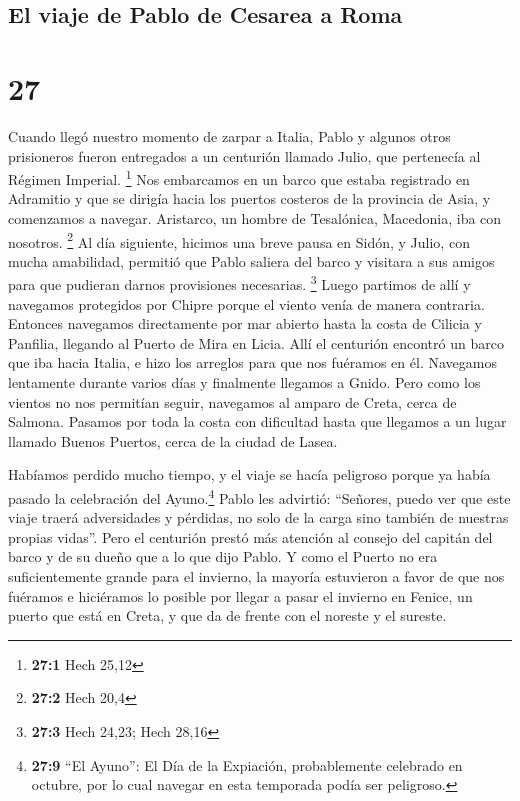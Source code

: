 \hypertarget{el-viaje-de-pablo-de-cesarea-a-roma}{%
\subsection{El viaje de Pablo de Cesarea a
Roma}\label{el-viaje-de-pablo-de-cesarea-a-roma}}

\hypertarget{section-26}{%
\section{27}\label{section-26}}

 Cuando llegó nuestro momento de zarpar a Italia, Pablo y
algunos otros prisioneros fueron entregados a un centurión llamado
Julio, que pertenecía al Régimen Imperial. \footnote{\textbf{27:1} Hech
  25,12}  Nos embarcamos en un barco que estaba registrado
en Adramitio y que se dirigía hacia los puertos costeros de la provincia
de Asia, y comenzamos a navegar. Aristarco, un hombre de Tesalónica,
Macedonia, iba con nosotros. \footnote{\textbf{27:2} Hech 20,4}
 Al día siguiente, hicimos una breve pausa en Sidón, y
Julio, con mucha amabilidad, permitió que Pablo saliera del barco y
visitara a sus amigos para que pudieran darnos provisiones necesarias.
\footnote{\textbf{27:3} Hech 24,23; Hech 28,16}  Luego
partimos de allí y navegamos protegidos por Chipre porque el viento
venía de manera contraria.  Entonces navegamos
directamente por mar abierto hasta la costa de Cilicia y Panfilia,
llegando al Puerto de Mira en Licia.  Allí el centurión
encontró un barco que iba hacia Italia, e hizo los arreglos para que nos
fuéramos en él.  Navegamos lentamente durante varios días
y finalmente llegamos a Gnido. Pero como los vientos no nos permitían
seguir, navegamos al amparo de Creta, cerca de Salmona. 
Pasamos por toda la costa con dificultad hasta que llegamos a un lugar
llamado Buenos Puertos, cerca de la ciudad de Lasea.

 Habíamos perdido mucho tiempo, y el viaje se hacía
peligroso porque ya había pasado la celebración del Ayuno.\footnote{\textbf{27:9}
  ``El Ayuno'': El Día de la Expiación, probablemente celebrado en
  octubre, por lo cual navegar en esta temporada podía ser peligroso.}
Pablo les advirtió:  ``Señores, puedo ver que este viaje
traerá adversidades y pérdidas, no solo de la carga sino también de
nuestras propias vidas''.  Pero el centurión prestó más
atención al consejo del capitán del barco y de su dueño que a lo que
dijo Pablo.  Y como el Puerto no era suficientemente
grande para el invierno, la mayoría estuvieron a favor de que nos
fuéramos e hiciéramos lo posible por llegar a pasar el invierno en
Fenice, un puerto que está en Creta, y que da de frente con el noreste y
el sureste.

